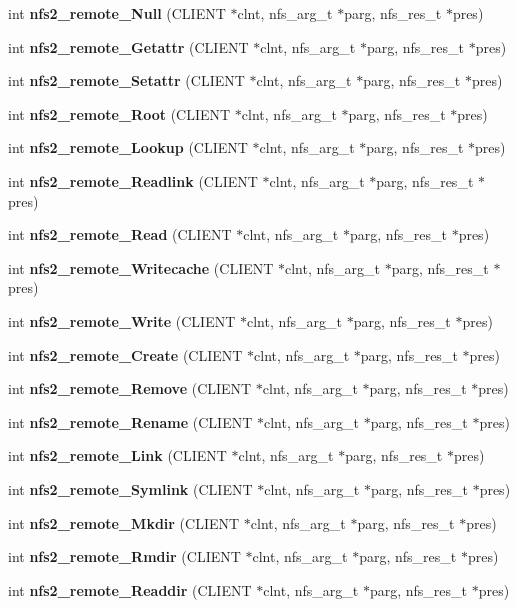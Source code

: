 \begin{CompactItemize}
\item 
int {\bf nfs2\_\-remote\_\-Null} (CLIENT $\ast$clnt, nfs\_\-arg\_\-t $\ast$parg, nfs\_\-res\_\-t $\ast$pres)
\item 
int {\bf nfs2\_\-remote\_\-Getattr} (CLIENT $\ast$clnt, nfs\_\-arg\_\-t $\ast$parg, nfs\_\-res\_\-t $\ast$pres)
\item 
int {\bf nfs2\_\-remote\_\-Setattr} (CLIENT $\ast$clnt, nfs\_\-arg\_\-t $\ast$parg, nfs\_\-res\_\-t $\ast$pres)
\item 
int {\bf nfs2\_\-remote\_\-Root} (CLIENT $\ast$clnt, nfs\_\-arg\_\-t $\ast$parg, nfs\_\-res\_\-t $\ast$pres)
\item 
int {\bf nfs2\_\-remote\_\-Lookup} (CLIENT $\ast$clnt, nfs\_\-arg\_\-t $\ast$parg, nfs\_\-res\_\-t $\ast$pres)
\item 
int {\bf nfs2\_\-remote\_\-Readlink} (CLIENT $\ast$clnt, nfs\_\-arg\_\-t $\ast$parg, nfs\_\-res\_\-t $\ast$pres)
\item 
int {\bf nfs2\_\-remote\_\-Read} (CLIENT $\ast$clnt, nfs\_\-arg\_\-t $\ast$parg, nfs\_\-res\_\-t $\ast$pres)
\item 
int {\bf nfs2\_\-remote\_\-Writecache} (CLIENT $\ast$clnt, nfs\_\-arg\_\-t $\ast$parg, nfs\_\-res\_\-t $\ast$pres)
\item 
int {\bf nfs2\_\-remote\_\-Write} (CLIENT $\ast$clnt, nfs\_\-arg\_\-t $\ast$parg, nfs\_\-res\_\-t $\ast$pres)
\item 
int {\bf nfs2\_\-remote\_\-Create} (CLIENT $\ast$clnt, nfs\_\-arg\_\-t $\ast$parg, nfs\_\-res\_\-t $\ast$pres)
\item 
int {\bf nfs2\_\-remote\_\-Remove} (CLIENT $\ast$clnt, nfs\_\-arg\_\-t $\ast$parg, nfs\_\-res\_\-t $\ast$pres)
\item 
int {\bf nfs2\_\-remote\_\-Rename} (CLIENT $\ast$clnt, nfs\_\-arg\_\-t $\ast$parg, nfs\_\-res\_\-t $\ast$pres)
\item 
int {\bf nfs2\_\-remote\_\-Link} (CLIENT $\ast$clnt, nfs\_\-arg\_\-t $\ast$parg, nfs\_\-res\_\-t $\ast$pres)
\item 
int {\bf nfs2\_\-remote\_\-Symlink} (CLIENT $\ast$clnt, nfs\_\-arg\_\-t $\ast$parg, nfs\_\-res\_\-t $\ast$pres)
\item 
int {\bf nfs2\_\-remote\_\-Mkdir} (CLIENT $\ast$clnt, nfs\_\-arg\_\-t $\ast$parg, nfs\_\-res\_\-t $\ast$pres)
\item 
int {\bf nfs2\_\-remote\_\-Rmdir} (CLIENT $\ast$clnt, nfs\_\-arg\_\-t $\ast$parg, nfs\_\-res\_\-t $\ast$pres)
\item 
int {\bf nfs2\_\-remote\_\-Readdir} (CLIENT $\ast$clnt, nfs\_\-arg\_\-t $\ast$parg, nfs\_\-res\_\-t $\ast$pres)

\end{CompactItemize}
